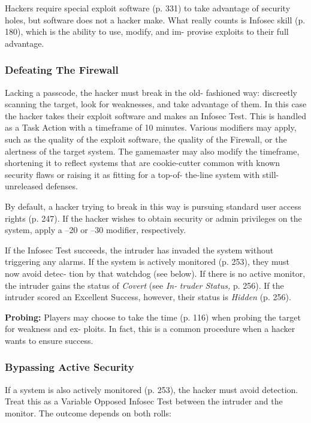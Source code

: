 Hackers require special exploit software (p. 331) to 
take advantage of security holes, but software does 
not a hacker make. What really counts is Infosec skill 
(p. 180), which is the ability to use, modify, and im-
provise exploits to their full advantage.

\subsubsection{Defeating The Firewall}

Lacking a passcode, the hacker must break in the old-
fashioned way: discreetly scanning the target, look for 
weaknesses, and take advantage of them. In this case 
the hacker takes their exploit software and makes an 
Infosec Test. This is handled as a Task Action with a 
timeframe of 10 minutes. Various modifiers may apply, 
such as the quality of the exploit software, the quality 
of the Firewall, or the alertness of the target system. The 
gamemaster may also modify the timeframe, shortening 
it to reflect systems that are cookie-cutter common with 
known security flaws or raising it as fitting for a top-of-
the-line system with still-unreleased defenses.

By default, a hacker trying to break in this way is 
pursuing standard user access rights (p. 247). If the 
hacker wishes to obtain security or admin privileges on 
the system, apply a –20 or –30 modifier, respectively.

If the Infosec Test succeeds, the intruder has invaded 
the system without triggering any alarms. If the system is 
actively monitored (p. 253), they must now avoid detec-
tion by that watchdog (see below). If there is no active 
monitor, the intruder gains the status of \textit{Covert} (see \textit{In-}
\textit{truder Status,} p. 256). If the intruder scored an Excellent 
Success, however, their status is \textit{Hidden }(p. 256).

\textbf{Probing:} Players may choose to take the time (p. 
116) when probing the target for weakness and ex-
ploits. In fact, this is a common procedure when a 
hacker wants to ensure success.

\subsubsection{Bypassing Active Security}

If a system is also actively monitored (p. 253), the 
hacker must avoid detection. Treat this as a Variable 
Opposed Infosec Test between the intruder and the 
monitor. The outcome depends on both rolls:

